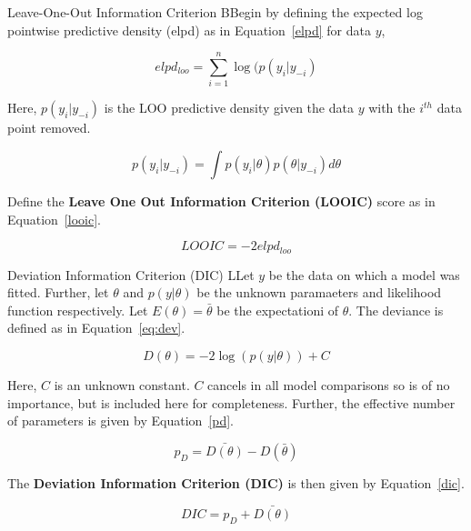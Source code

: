 \begin{definition}{Leave-One-Out Information Criterion}
    BBegin by defining the expected log pointwise predictive density (elpd) as in Equation~\ref{elpd} for data $y$,
    
    \begin{equation}
        elpd_{loo} = \sum_{i = 1}^n \log(p(y_i | y_{-i})
        \label{elpd}
    \end{equation}
    
    Here, $p(y_i|y_{-i})$ is the LOO predictive density given the data $y$ with the $i^{th}$ data point removed.
    
    \begin{equation}
        p(y_i | y_{-i}) = \int p(y_i|\theta)p(\theta|y_{-i})d\theta
        \label{loopd}
    \end{equation}
    
    Define the \textbf{Leave One Out Information Criterion (LOOIC)} score as in Equation~\ref{looic}.
    
    \begin{equation}
        LOOIC = -2elpd_{loo}
        \label{looic}
    \end{equation}
    \label{def:looic}
\end{definition}

\begin{definition}{Deviation Information Criterion (DIC)}
    LLet $y$ be the data on which a model was fitted. Further, let $\theta$ and $p(y|\theta)$ be the unknown paramaeters and likelihood function respectively. Let $E(\theta) = \bar{\theta}$ be the expectationi of $\theta$. The deviance is defined as in Equation~\ref{eq:dev}. 

    \begin{equation}
        D(\theta) = -2\log(p(y|\theta)) + C
        \label{eq:dev}
    \end{equation}

    Here, $C$ is an unknown constant. $C$ cancels in all model comparisons so is of no importance, but is included here for completeness. Further, the effective number of parameters is given by Equation~\ref{pd}.

    \begin{equation}
        p_D = \bar{D(\theta)} - D(\bar{\theta})
        \label{pd}
    \end{equation}

    The \textbf{Deviation Information Criterion (DIC)} is then given by Equation~\ref{dic}.

    \begin{equation}
        DIC = p_D + \bar{D(\theta)}
        \label{dic}
    \end{equation}
    \label{def:dic}
\end{definition}

